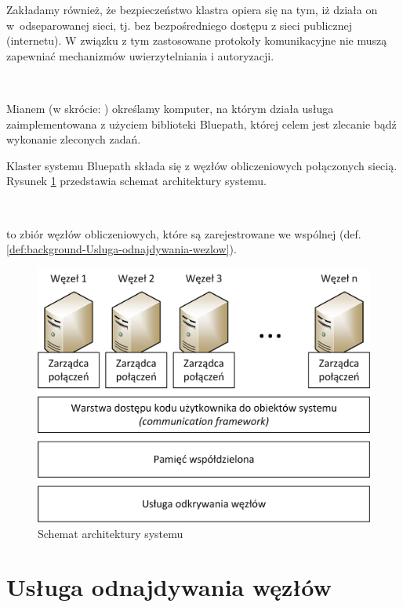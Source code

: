 Zakładamy również, że bezpieczeństwo klastra opiera się na tym, iż
działa on w~odseparowanej sieci, tj. bez bezpośredniego dostępu z
sieci publicznej (internetu). W związku z tym zastosowane protokoły
komunikacyjne nie muszą zapewniać mechanizmów uwierzytelniania i autoryzacji.
\begin{defn}
~

\noindent \label{def:background-Wezel-obliczeniowy}Mianem 
(w skrócie: ) określamy komputer, na którym działa
usługa zaimplementowana z użyciem biblioteki Bluepath, której celem
jest zlecanie bądź wykonanie zleconych zadań.
\end{defn}
Klaster systemu Bluepath składa się z węzłów obliczeniowych połączonych
siecią. Rysunek \ref{fig:background-schemat-systemu} przedstawia
schemat architektury systemu.
\begin{defn}
~

\noindent \label{def:background-Klaster} to zbiór
węzłów obliczeniowych, które są zarejestrowane we wspólnej 
(def. \ref{def:background-Usluga-odnajdywania-wezlow}).
\end{defn}
\begin{figure}
\centering{}\includegraphics[scale=0.85]{images/schemat-systemu}\protect\caption{\label{fig:background-schemat-systemu}Schemat architektury systemu}
\end{figure}



\section{Usługa odnajdywania węzłów}


